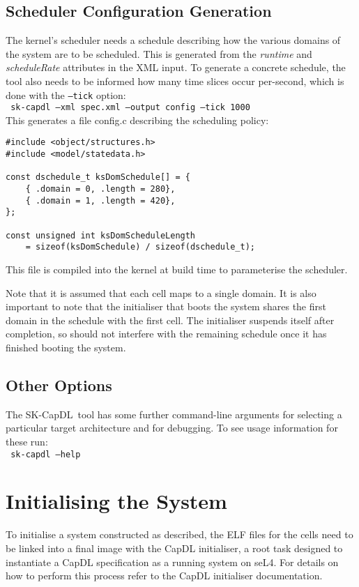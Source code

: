 \documentclass[a4paper,11pt,twoside]{report}
\newcommand{\skcapdl}{SK-CapDL}
\newcommand{\skentity}[1]{\emph{#1}}
\newcommand{\code}[1]{\\[+4pt]
{{\tt \hphantom{    } #1}}\\[+4pt]
}
\begin{document}
  \section{\label{sec:configgen}Scheduler Configuration Generation}
The kernel's scheduler needs a schedule describing how the various domains of
the system are to be scheduled. This is generated from the \skentity{runtime}
and \skentity{scheduleRate} attributes in the XML input. To generate a concrete
schedule, the tool also needs to be informed how many time slices occur
per-second, which is done with the {\tt --tick} option:
\code{
    sk-capdl --xml spec.xml --output config --tick 1000
}
This generates a file config.c describing the scheduling policy:
\begin{lstlisting}
#include <object/structures.h>
#include <model/statedata.h>

const dschedule_t ksDomSchedule[] = {
    { .domain = 0, .length = 280},
    { .domain = 1, .length = 420},
};

const unsigned int ksDomScheduleLength
    = sizeof(ksDomSchedule) / sizeof(dschedule_t);
\end{lstlisting}
This file is compiled into the kernel at build time to parameterise the
scheduler.

Note that it is assumed that each cell maps to a single domain. It is also
important to note that the initialiser that boots the system shares the first
domain in the schedule with the first cell. The initialiser suspends itself
after completion, so should not interfere with the remaining schedule once it
has finished booting the system.

  \section{\label{sec:extraopts}Other Options}
The \skcapdl~tool has some further command-line arguments for selecting a particular target architecture and for debugging.
To see usage information for these run:
\code{
    sk-capdl --help
}

  \chapter{\label{s:init}Initialising the System}
To initialise a system constructed as described, the ELF files for the cells need to be linked into a final image with the CapDL initialiser, a root task designed to instantiate a CapDL specification as a running system on seL4.
For details on how to perform this process refer to the CapDL initialiser documentation.

  \cleardoublepage
  
  
\end{document}
